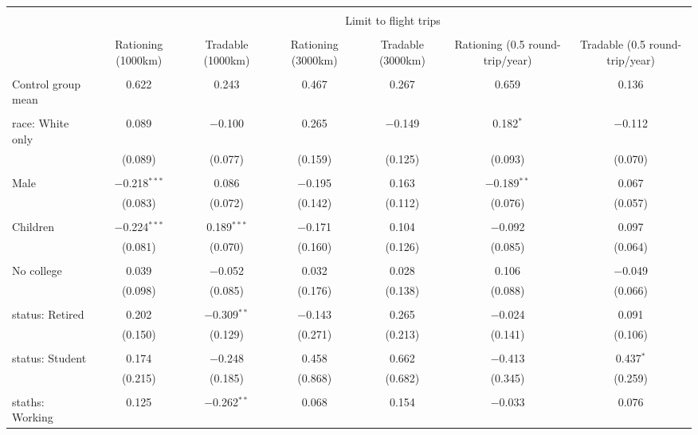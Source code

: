 
\begin{tabular}{@{\extracolsep{5pt}}lcccccc} 
\\[-1.8ex]\hline 
\hline \\[-1.8ex] 
 & \multicolumn{6}{c}{Limit to flight trips} \\ 
\cline{2-7} 
\\[-1.8ex] & Rationing (1000km) & Tradable (1000km) & Rationing (3000km) & Tradable (3000km) & Rationing (0.5 round-trip/year) & Tradable (0.5 round-trip/year) \\ 
\hline \\[-1.8ex] 
 Control group mean & 0.622 & 0.243 & 0.467 & 0.267 & 0.659 & 0.136  \\ \hline \\[-1.8ex] race: White only & 0.089 & $-$0.100 & 0.265 & $-$0.149 & 0.182$^{*}$ & $-$0.112 \\ 
  & (0.089) & (0.077) & (0.159) & (0.125) & (0.093) & (0.070) \\ 
  & & & & & & \\ 
 Male & $-$0.218$^{***}$ & 0.086 & $-$0.195 & 0.163 & $-$0.189$^{**}$ & 0.067 \\ 
  & (0.083) & (0.072) & (0.142) & (0.112) & (0.076) & (0.057) \\ 
  & & & & & & \\ 
 Children & $-$0.224$^{***}$ & 0.189$^{***}$ & $-$0.171 & 0.104 & $-$0.092 & 0.097 \\ 
  & (0.081) & (0.070) & (0.160) & (0.126) & (0.085) & (0.064) \\ 
  & & & & & & \\ 
 No college & 0.039 & $-$0.052 & 0.032 & 0.028 & 0.106 & $-$0.049 \\ 
  & (0.098) & (0.085) & (0.176) & (0.138) & (0.088) & (0.066) \\ 
  & & & & & & \\ 
 status: Retired & 0.202 & $-$0.309$^{**}$ & $-$0.143 & 0.265 & $-$0.024 & 0.091 \\ 
  & (0.150) & (0.129) & (0.271) & (0.213) & (0.141) & (0.106) \\ 
  & & & & & & \\ 
 status: Student & 0.174 & $-$0.248 & 0.458 & 0.662 & $-$0.413 & 0.437$^{*}$ \\ 
  & (0.215) & (0.185) & (0.868) & (0.682) & (0.345) & (0.259) \\ 
  & & & & & & \\ 
 staths: Working & 0.125 & $-$0.262$^{**}$ & 0.068 & 0.154 & $-$0.033 & 0.076 \\ 

\end{tabular}
